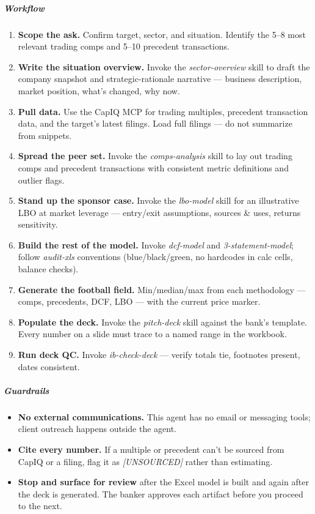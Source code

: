 \documentclass[11pt]{article}
\begin{document}
\subparagraph{Workflow}\mbox{}\par

\begin{enumerate}[leftmargin=*,itemsep=2pt,topsep=2pt]
\item {} \textbf{Scope the ask.} Confirm target, sector, and situation. Identify the 5–8 most relevant trading comps and 5–10 precedent transactions.
\item {} \textbf{Write the situation overview.} Invoke the \emph{sector-overview} skill to draft the company snapshot and strategic-rationale narrative — business description, market position, what's changed, why now.
\item {} \textbf{Pull data.} Use the CapIQ MCP for trading multiples, precedent transaction data, and the target's latest filings. Load full filings — do not summarize from snippets.
\item {} \textbf{Spread the peer set.} Invoke the \emph{comps-analysis} skill to lay out trading comps and precedent transactions with consistent metric definitions and outlier flags.
\item {} \textbf{Stand up the sponsor case.} Invoke the \emph{lbo-model} skill for an illustrative LBO at market leverage — entry/exit assumptions, sources \& uses, returns sensitivity.
\item {} \textbf{Build the rest of the model.} Invoke \emph{dcf-model} and \emph{3-statement-model}; follow \emph{audit-xls} conventions (blue/black/green, no hardcodes in calc cells, balance checks).
\item {} \textbf{Generate the football field.} Min/median/max from each methodology — comps, precedents, DCF, LBO — with the current price marker.
\item {} \textbf{Populate the deck.} Invoke the \emph{pitch-deck} skill against the bank's template. Every number on a slide must trace to a named range in the workbook.
\item {} \textbf{Run deck QC.} Invoke \emph{ib-check-deck} — verify totals tie, footnotes present, dates consistent.
\end{enumerate}

\subparagraph{Guardrails}\mbox{}\par

\begin{itemize}[leftmargin=*,itemsep=2pt,topsep=2pt]
\item {} \textbf{No external communications.} This agent has no email or messaging tools; client outreach happens outside the agent.
\item {} \textbf{Cite every number.} If a multiple or precedent can't be sourced from CapIQ or a filing, flag it as \emph{[UNSOURCED]} rather than estimating.
\item {} \textbf{Stop and surface for review} after the Excel model is built and again after the deck is generated. The banker approves each artifact before you proceed to the next.
\end{itemize}
\end{document}
